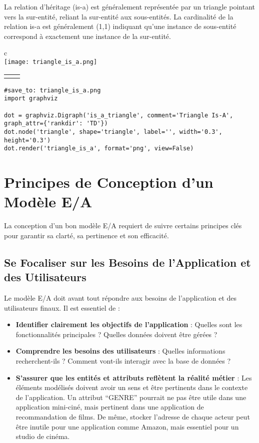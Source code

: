 \documentclass{article}
\begin{document}
La relation d'héritage (is-a) est généralement représentée par un triangle pointant vers la sur-entité, reliant la sur-entité aux sous-entités. La cardinalité de la relation is-a est généralement (1,1) indiquant qu'une instance de sous-entité correspond à exactement une instance de la sur-entité.

\begin{center}
    \begin{tabular}{c}
          \\
         \texttt{[image: triangle\_is\_a.png]} \\
         \begin{tabular}{cc}
              \fbox{Documentaire} & \fbox{Animation}
         \end{tabular}
    \end{tabular}
\end{center}
\begin{verbatim}
#save_to: triangle_is_a.png
import graphviz

dot = graphviz.Digraph('is_a_triangle', comment='Triangle Is-A', graph_attr={'rankdir': 'TD'})
dot.node('triangle', shape='triangle', label='', width='0.3', height='0.3')
dot.render('triangle_is_a', format='png', view=False)
\end{verbatim}


\section{Principes de Conception d'un Modèle E/A}

La conception d'un bon modèle E/A requiert de suivre certains principes clés pour garantir sa clarté, sa pertinence et son efficacité.

\subsection{Se Focaliser sur les Besoins de l'Application et des Utilisateurs}

Le modèle E/A doit avant tout répondre aux besoins de l'application et des utilisateurs finaux. Il est essentiel de :

\begin{itemize}
    \item \textbf{Identifier clairement les objectifs de l'application} : Quelles sont les fonctionnalités principales ? Quelles données doivent être gérées ?
    \item \textbf{Comprendre les besoins des utilisateurs} : Quelles informations recherchent-ils ? Comment vont-ils interagir avec la base de données ?
    \item \textbf{S'assurer que les entités et attributs reflètent la réalité métier} :  Les éléments modélisés doivent avoir un sens et être pertinents dans le contexte de l'application.  Un attribut ``GENRE'' pourrait ne pas être utile dans une application mini-ciné, mais pertinent dans une application de recommandation de films. De même, stocker l'adresse de chaque acteur peut être inutile pour une application comme Amazon, mais essentiel pour un studio de cinéma.
\end{itemize}
\end{document}
